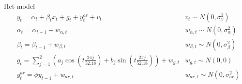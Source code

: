 \documentclass[final, 12pt, aspectratio=169, xcolor={dvipsnames}]{beamer}
\begin{document}
\begin{frame}{Het model}
  \[
\begin{aligned}
&y_{t} = \alpha_{t} + \beta_{t} x_{t} + g_{t} + y_{t}^{ar} + v_{t} & v_{t} \sim N(0, \sigma_{v}^{2}) \\
&\alpha_{t} = \alpha_{t-1} + w_{\alpha, t} & w_{\alpha, t} \sim N(0, \sigma_{\alpha}^{2}) \\
&\beta_{t} = \beta_{t-1} + w_{\beta, t} & w_{\beta, t} \sim N(0, \sigma_{\beta}^{2}) \\
&g_{t} = \sum_{j=1}^{2} \left( a_{j} \cos \left( t \frac{2 \pi j}{52.18} \right) + b_{j} \sin \left( t \frac{2 \pi j}{52.18} \right) \right) + w_{g, t} & w_{g, t} \sim N(0, 0) \\
&y_{t}^{ar} = \phi y_{t-1} + w_{ar,t} & w_{ar,t} \sim N(0, \sigma_{ar}^{2})
\end{aligned}
\]
 \end{frame}
\end{document}
